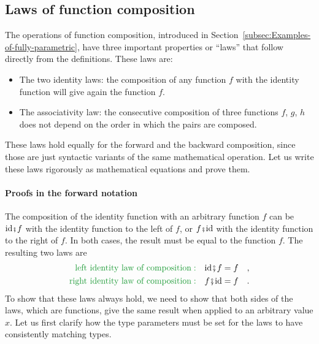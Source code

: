 \subsection{Laws of function composition\label{subsec:Laws-of-function-composition}}

The operations of function composition, introduced in Section~\ref{subsec:Examples-of-fully-parametric},
have three important properties or ``laws'' that follow directly
from the definitions. These laws are:
\begin{itemize}
\item The two identity laws:
the composition of any function $f$ with the identity function will
give again the function $f$.
\item The associativity law:
the consecutive composition of three functions $f$, $g$, $h$ does
not depend on the order in which the pairs are composed.
\end{itemize}
These laws hold equally for the forward and the backward composition,
since those are just syntactic variants of the same mathematical operation.
Let us write these laws rigorously as mathematical equations and prove
them.

\paragraph{Proofs in the forward notation}

The composition of the identity function with an arbitrary function
$f$ can be $\text{id}\bef f$ with the identity function to the left
of $f$, or $f\bef\text{id}$ with the identity function to the right
of $f$. In both cases, the result must be equal to the function $f$.
The resulting two laws are
\begin{align*}
{\color{greenunder}\text{left identity law of composition}:}\quad & \text{id}\bef f=f\quad,\\
{\color{greenunder}\text{right identity law of composition}:}\quad & f\bef\text{id}=f\quad.
\end{align*}
To show that these laws always hold, we need to show that both sides
of the laws, which are functions, give the same result when applied
to an arbitrary value $x$. Let us first clarify how the type parameters
must be set for the laws to have consistently matching types.

